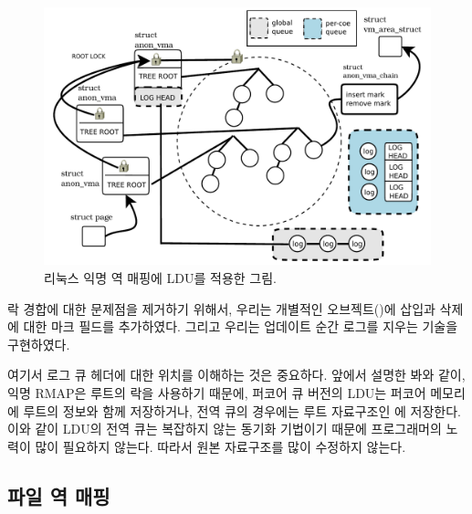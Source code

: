 \begin{figure}[tb]
  \begin{center}
     \includegraphics[width=1\textwidth,height=1\textheight,keepaspectratio]{fig/anon_vma}
  \end{center}
  \caption{리눅스 익명 역 매핑에 LDU를 적용한 그림.}
  \label{fig:anonvmaramp}
\end{figure}

락 경합에 대한 문제점을 제거하기 위해서, 우리는 개별적인 오브젝트()에 
삽입과 삭제에 대한 마크 필드를 추가하였다. 
그리고 우리는 업데이트 순간 로그를 지우는 기술을 구현하였다.

여기서 로그 큐 헤더에 대한 위치를 이해하는 것은 중요하다.
앞에서 설명한 봐와 같이, 익명 RMAP은 루트의 락을 사용하기 때문에, 퍼코어 큐 버전의 LDU는 
퍼코어 메모리에 루트의 정보와 함께 저장하거나, 전역 큐의 경우에는 루트 자료구조인 에 
저장한다. 
이와 같이 LDU의 전역 큐는 복잡하지 않는 동기화 기법이기 때문에 프로그래머의 노력이 많이 필요하지 않는다.
따라서 원본 자료구조를 많이 수정하지 않는다. 

\subsection{파일 역 매핑}

